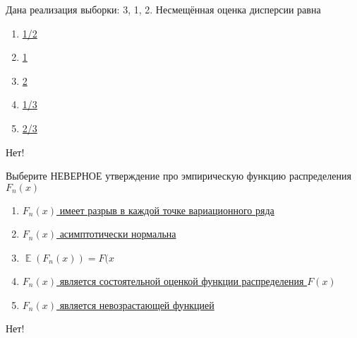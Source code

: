 \documentclass[t]{beamer}
\DeclareMathOperator{\E}{\mathbb{E}}
\begin{document}
 \begin{frame} \label{21-No} 
\begin{block}{21} 

  Дана реализация выборки: 3, 1, 2. Несмещённая оценка дисперсии равна
  


 \end{block} 
\begin{enumerate} 
\item[] \hyperlink{21-No}{\beamergotobutton{} 1/2}
\item[] \hyperlink{21-Yes}{\beamergotobutton{} 1}
\item[] \hyperlink{21-No}{\beamergotobutton{} 2}
\item[] \hyperlink{21-No}{\beamergotobutton{} 1/3}
\item[] \hyperlink{21-No}{\beamergotobutton{} 2/3}
\end{enumerate} 

 \alert{Нет!} 
\end{frame} 


 \begin{frame} \label{22-No} 
\begin{block}{22} 

  Выберите НЕВЕРНОЕ утверждение про эмпирическую функцию распределения $F_n(x)$
  


 \end{block} 
\begin{enumerate} 
\item[] \hyperlink{22-No}{\beamergotobutton{} $F_n(x)$ имеет разрыв в каждой точке вариационного ряда}
\item[] \hyperlink{22-No}{\beamergotobutton{} $F_n(x)$ асимптотически нормальна}
\item[] \hyperlink{22-No}{\beamergotobutton{} $\E(F_n(x))=F(x$}
\item[] \hyperlink{22-No}{\beamergotobutton{} $F_n(x)$ является состоятельной оценкой функции распределения $F(x)$}
\item[] \hyperlink{22-Yes}{\beamergotobutton{} $F_n(x)$ является невозрастающей функцией}
\end{enumerate} 

 \alert{Нет!} 
\end{frame} 
\end{document}
